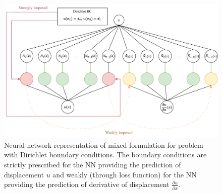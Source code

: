 
\begin{figure}
    \centering
    \includegraphics[trim={0 0 0 0},clip,width = 0.9\linewidth]{Figures/BC_1.drawio.pdf}    
    \caption{Neural network representation of mixed formulation for problem with Dirichlet boundary conditions. The boundary conditions are strictly prescribed for the NN providing the prediction of displacement $u$ and weakly (through loss function) for the NN providing the prediction of derivative of displacement $\frac{\partial u}{\partial x}$.   }
    \label{fig:BCsMixed}
\end{figure}